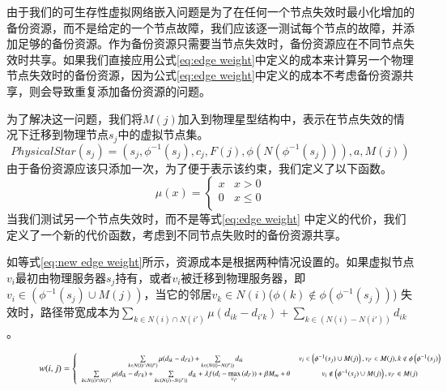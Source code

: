 由于我们的可生存性虚拟网络嵌入问题是为了在任何一个节点失效时最小化增加的备份资源，而不是给定的一个节点故障，我们应该逐一测试每个节点的故障，并添加足够的备份资源。作为备份资源只需要当节点失效时，备份资源应在不同节点失效时共享。如果我们直接应用公式\ref{eq:edge weight}中定义的成本来计算另一个物理节点失效时的备份资源，因为公式\ref{eq:edge weight}中定义的成本不考虑备份资源共享，则会导致重复添加备份资源的问题。

为了解决这一问题，我们将$M(j)$加入到物理星型结构中，表示在节点失效的情况下迁移到物理节点$s_j$中的虚拟节点集。
\begin{equation}
PhysicalStar(s_j)=(s_j, \phi^{-1}( s_j), c_j, F(j), \phi(N(\phi^{-1}( s_j))), a, M(j))
\end{equation}
由于备份资源应该只添加一次，为了便于表示该约束，我们定义了以下函数。
\begin{equation}
\mu (x) = \left\{ {\begin{array}{*{20}{c}}
   x & {x > 0}  \\
   0 & {x \le 0}  \\
\end{array}} \right.
\end{equation}
当我们测试另一个节点失效时，而不是等式\ref{eq:edge weight} 中定义的代价，我们定义了一个新的代价函数，考虑到不同节点失败时的备份资源共享。

如等式\ref{eq:new edge weight}所示，资源成本是根据两种情况设置的。如果虚拟节点$v_i$最初由物理服务器$s_j$持有，或者$v_i$被迁移到物理服务器，即${{v_i} \in \left( {{\phi ^{ - 1}}({s_j}) \cup M(j)} \right)}$，当它的邻居$v_k \in N(i)$(${\phi \left( k \right) \notin \phi \left( {{\phi ^{ - 1}}({s_j})} \right)}$) 失效时，路径带宽成本为${\sum\limits_{k \in N(i) \cap N(i')} {\mu({d_{ik}} - {d_{i'k}})}  + \sum\limits_{k \in \left( {N(i) - N(i')} \right)} {{d_{ik}}} }$。

\begin{figure}
  \centering
    \begin{equation}
  \footnotesize
w(i,j) = \left\{ {\begin{array}{*{20}{c}}
   {\sum\limits_{k \in N(i) \cap N(i')} {\mu({d_{ik}} - {d_{i'k}})}  + \sum\limits_{k \in \left( {N(i) - N(i')} \right)} {{d_{ik}}} } & {{v_i} \in \left( {{\phi ^{ - 1}}({s_j}) \cup M(j)} \right),{v_{i'}} \in M(j),k \notin \phi \left( {{\phi ^{ - 1}}({s_j})} \right)}  \\
   {\sum\limits_{k \in N(i) \cap N(i')} {\mu({d_{ik}} - {d_{i'k}})}  + \sum\limits_{k \in \left( {N(i) - N(i')} \right)} {{d_{ik}}}  + \lambda f({d_i} - \mathop {\max }\limits_{{v_{i'}}} \left( {{d_{i'}}} \right)) + \beta {M_m} + \theta } & {{v_i} \notin \left( {{\phi ^{ - 1}}({s_j}) \cup M(j)} \right),{v_{i'}} \in M(j)}  \\
\end{array}} \right.
    \label{eq:new edge weight}
    \end{equation}
\end{figure}

